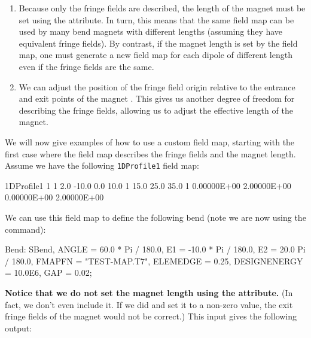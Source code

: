 \begin{enumerate}
\item Because only the fringe fields are described, the length of the magnet must be set using the 
  attribute. In turn, this means that the same field map can be used by many bend magnets with different
  lengths (assuming they have equivalent fringe fields). By contrast, if the magnet length is set by the
  field map, one must generate a new field map for each dipole of different length even if the fringe fields are the
  same.
\item We can adjust the position of the fringe field origin relative to the entrance and exit points of the
  magnet . This gives us another degree
  of freedom for describing the fringe fields, allowing us to adjust the effective length of the magnet.
\end{enumerate}

We will now give examples of how to use a custom field map, starting with the first case where the field
map describes the fringe fields and the magnet length. Assume we have the following \texttt{1DProfile1} field
map:

\begin{example}
1DProfile1 1 1 2.0
 -10.0  0.0  10.0 1
  15.0  25.0 35.0 1
  0.00000E+00
  2.00000E+00
  0.00000E+00
  2.00000E+00
\end{example}
We can use this field map to define the following bend (note we are now using the  command):

\begin{example}
Bend: SBend, ANGLE = 60.0 * Pi / 180.0,
             E1 = -10.0 * Pi / 180.0,
             E2 = 20.0  Pi / 180.0,
	     FMAPFN = "TEST-MAP.T7",
	     ELEMEDGE = 0.25,
	     DESIGNENERGY = 10.0E6,
	     GAP = 0.02;
\end{example}
\textbf{Notice that we do not set the magnet length using the  attribute.} (In fact, we don't even
include it. If we did and set it to a non-zero value, the exit fringe fields of the magnet would not be correct.)
This input gives the following output:

